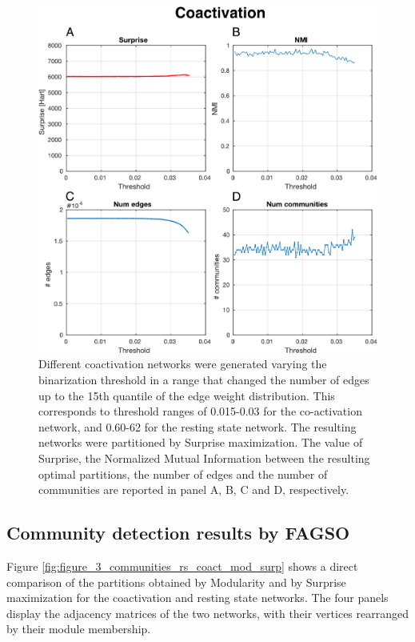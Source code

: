 \begin{figure}[htb!]
\centering
\includegraphics[width=0.7\linewidth]{images/coactivation_study_threshold.pdf}
\caption{Different coactivation networks were generated varying the binarization threshold in a range that changed the number of edges up to the 15th quantile of the edge weight distribution. This corresponds to threshold ranges of 0.015-0.03 for the co-activation network, and 0.60-62 for the resting state network. The resulting networks were partitioned by Surprise maximization. The value of Surprise, the Normalized Mutual Information between the resulting optimal partitions, the number of edges and the number of communities are reported in panel A, B, C and D, respectively.}
\label{fig:figure_10_rs_threshold_study}
\end{figure}

\subsection{Community detection results by FAGSO}
Figure \ref{fig:figure_3_communities_rs_coact_mod_surp} shows a direct comparison of the partitions obtained by Modularity and by Surprise maximization for the coactivation and resting state networks. The four panels display the adjacency matrices of the two networks, with their vertices rearranged by their module membership.

